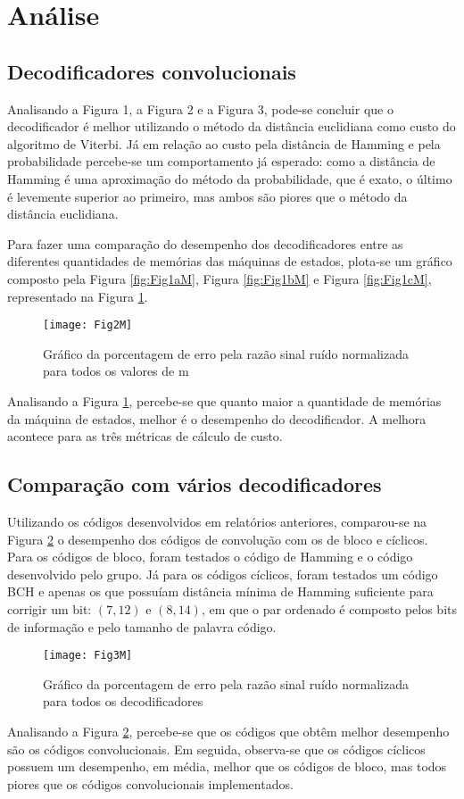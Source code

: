 \section{Análise}

\subsection{Decodificadores convolucionais}

Analisando a Figura 1, a Figura 2 e a Figura 3, pode-se concluir que o decodificador é melhor utilizando o método da distância euclidiana como custo do algoritmo de Viterbi. Já em relação ao custo pela distância de Hamming e pela probabilidade percebe-se um comportamento já esperado: como a distância de Hamming é uma aproximação do método da probabilidade, que é exato, o último é levemente superior ao primeiro, mas ambos são piores que o método da distância euclidiana.

Para fazer uma comparação do desempenho dos decodificadores entre as diferentes quantidades de memórias das máquinas de estados, plota-se um gráfico composto pela Figura \ref{fig:Fig1aM}, Figura \ref{fig:Fig1bM} e Figura \ref{fig:Fig1cM}, representado na Figura \ref{fig:Fig2M}.

\begin{figure}[H]
	\centering
	\texttt{[image: Fig2M]}
	\captionsetup{font=scriptsize}
	\caption{Gráfico da porcentagem de erro pela razão sinal ruído normalizada para todos os valores de m\label{fig:Fig2M}}
\end{figure}

Analisando a Figura \ref{fig:Fig2M}, percebe-se que quanto maior a quantidade de memórias da máquina de estados, melhor é o desempenho do decodificador. A melhora acontece para as três métricas de cálculo de custo.

\subsection{Comparação com vários decodificadores}

Utilizando os códigos desenvolvidos em relatórios anteriores, comparou-se na Figura \ref{fig:Fig3M} o desempenho dos códigos de convolução com os de bloco e cíclicos. Para os códigos de bloco, foram testados o código de Hamming e o código desenvolvido pelo grupo. Já para os códigos cíclicos, foram testados um código BCH  e apenas os que possuíam distância mínima de Hamming suficiente para corrigir um bit: $(7,12)$ e $(8,14)$, em que o par ordenado é composto pelos bits de informação e pelo tamanho de palavra código.

\begin{figure}[H]
	\centering
	\texttt{[image: Fig3M]}
	\captionsetup{font=scriptsize}
	\caption{Gráfico da porcentagem de erro pela razão sinal ruído normalizada para todos os decodificadores\label{fig:Fig3M}}
\end{figure}

Analisando a Figura \ref{fig:Fig3M}, percebe-se que os códigos que obtêm melhor desempenho são os códigos convolucionais. Em seguida, observa-se que os códigos cíclicos possuem um desempenho, em média, melhor que os códigos de bloco, mas todos piores que os códigos convolucionais implementados.